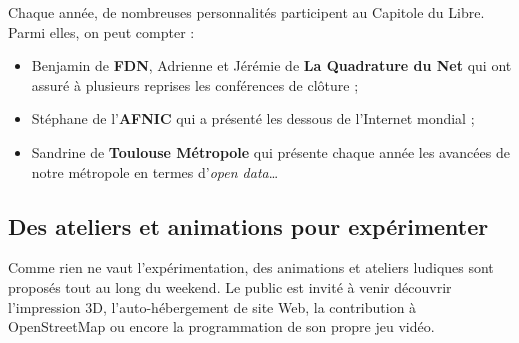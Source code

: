 Chaque année, de nombreuses personnalités participent au Capitole du Libre. Parmi elles, on peut compter :

\begin{itemize}[label=$\bullet$]
\item Benjamin  de \textbf{FDN}, Adrienne  et Jérémie  de \textbf{La Quadrature du Net} qui ont assuré à plusieurs reprises les conférences de clôture ;
\item Stéphane  de l'\textbf{AFNIC} qui a présenté les dessous de l'Internet mondial ;
\item Sandrine  de \textbf{Toulouse Métropole} qui présente chaque année les avancées de notre métropole en termes d'\textit{open data}\dots
\end{itemize} 

\subsection{Des ateliers et animations pour expérimenter}

\begin{minipage}{0.6\textwidth}

Comme rien ne vaut l'expérimentation, des animations et ateliers ludiques sont proposés tout au long du weekend. Le public est invité à venir découvrir l’impression 3D, l’auto-hébergement de site Web, la contribution à OpenStreetMap ou encore la programmation de son propre jeu vidéo.

\end{minipage}
\begin{minipage}{0.4\textwidth}
\begin{center}
\end{center}
\end{minipage}

